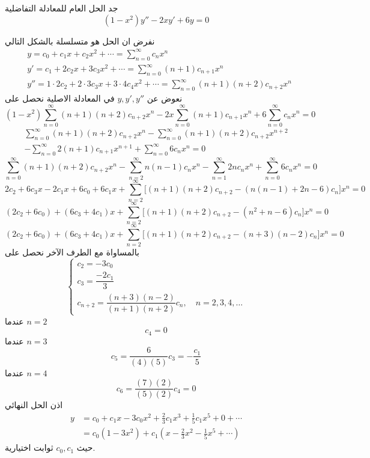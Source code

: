 \begin{example}
	جد الحل العام للمعادلة التفاضلية
	\[
	(1-x^2) y'' - 2xy' + 6y =0
	\]
\end{example}
\begin{solution}
	نفرض ان الحل هو متسلسلة بالشكل التالي
	\begin{align*}
		& y = c_0 + c_1 x + c_2 x^2 + \cdots = \sum_{n=0}^{\infty} c_n x^n \\[10pt]
		& y' = c_1 + 2c_2x + 3c_3 x^2 + \cdots = \sum_{n=0}^{\infty} (n+1)c_{n+1} x^n \\[10pt]
		& y'' = 1\cdot2 c_2 + 2\cdot3 c_3x + 3\cdot4 c_4 x^2 + \cdots = \sum_{n=0}^{\infty} (n+1)(n+2)c_{n+2}x^n 
	\end{align*}
	نعوض عن $y,y',y''$ في المعادلة الاصلية نحصل على 
	\[
	(1-x^2) \sum_{n=0}^{\infty} (n+1)(n+2)c_{n+2}x^n - 2x \sum_{n=0}^{\infty} (n+1)c_{n+1} x^n + 6\sum_{n=0}^{\infty} c_n x^n =0
	\]
	\begin{multline*}
		\sum_{n=0}^{\infty} (n+1)(n+2)c_{n+2}x^n - \sum_{n=0}^{\infty} (n+1)(n+2)c_{n+2}x^{n+2}   \\ -\sum_{n=0}^{\infty} 2(n+1)c_{n+1} x^{n+1} + \sum_{n=0}^{\infty} 6c_n x^n =0
	\end{multline*}
	\[
		\sum_{n=0}^{\infty} (n+1)(n+2)c_{n+2}x^n - \sum_{n=2}^{\infty} n(n-1)c_{n}x^{n}    -\sum_{n=1}^{\infty} 2nc_{n} x^{n} + \sum_{n=0}^{\infty} 6c_n x^n =0
\]
\[
2c_2 + 6c_3 x - 2c_1x + 6c_0 + 6c_1 x + \sum_{n=2}^{\infty} \big[(n+1)(n+2)c_{n+2} - (n(n-1) +2n -6)c_n\big] x^n = 0
\]
\[
(2c_2 +6c_0) + (6c_3 +4c_1)x  + \sum_{n=2}^{\infty} \big[(n+1)(n+2)c_{n+2} - (n^2+n -6)c_n\big] x^n = 0
\]
\[
(2c_2 +6c_0) + (6c_3 +4c_1)x  + \sum_{n=2}^{\infty} \big[(n+1)(n+2)c_{n+2} - (n+3)(n-2)c_n\big] x^n = 0
\]
بالمساواة مع الطرف الآخر نحصل على
\[
\left\{
\begin{array}{l}
	c_2 = -3c_0\\
	c_3 = \dfrac{-2c_1}{3}\\
	c_{n+2} = \dfrac{(n+3)(n-2)}{(n+1)(n+2)} c_n , \quad n=2,3,4,\dots
\end{array}
\right.
\]
عندما $n=2 $ 
\[
c_4 = 0
\]
عندما $n=3 $
\[
c_5 = \frac{6}{(4)(5)} c_3 =- \frac{c_1}{5}
\]
عندما $n=4 $ 
\[
c_6 = \frac{(7)(2)}{(5)(2)} c_4 = 0
\]
اذن الحل النهائي 
\begin{align*}
	y &= c_0 + c_1 x - 3c_0 x^2 + \frac{2}{3}c_1 x^3 +  \frac{1}{5}c_1 x^5 + 0 + \cdots\\
	& = c_0 (1-3x^2) + c_1 \left(x - \frac{2}{3}x^2 - \frac{1}{5}x^5 + \cdots\right)
\end{align*}
حيث $c_0, c_1 $ ثوابت اختيارية.
\end{solution}